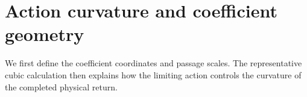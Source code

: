 \section{Action curvature and coefficient geometry}
\label{sec:small-positive-source-dictionaries}

We first define the coefficient coordinates and passage scales. The
representative cubic calculation then explains how the limiting action
controls the curvature of the completed physical return.



